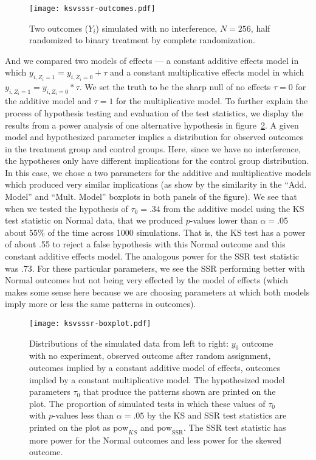 \begin{figure}[H]\centering
  \texttt{[image: ksvsssr-outcomes.pdf]}
  \caption{Two outcomes ($Y_i$) simulated with no interference, $N=256$, half
    randomized to binary treatment by complete randomization. }\label{fig:simpleoutcomes}
\end{figure}

And we compared two models of effects --- a constant additive effects model in
which $y_{i,Z_i=1}=y_{i,Z_i=0}+\tau$ and a constant multiplicative effects
model in which $y_{i,Z_i=1}=y_{i,Z_i=0}*\tau$. We set the truth to be the
sharp null of no effects $\tau=0$ for the additive model and $\tau=1$ for the
multiplicative model. To further explain the process of hypothesis testing and
evaluation of the test statistics, we display the results from a power
analysis of one alternative hypothesis in figure~\ref{fig:boxplot}. A given
model and hypothesized parameter implies a distribution for observed outcomes
in the treatment group and control groups. Here, since we have no
interference, the hypotheses only have different implications for the control
group distribution. In this case, we chose a two parameters for the additive
and multiplicative models which produced very similar implications (as show by
the similarity in the ``Add. Model'' and ``Mult.  Model'' boxplots in both
panels of the figure). We see that when we tested the hypothesis of
$\tau_0=.34$ from the additive model using the KS test statistic on Normal
data, that we produced $p$-values lower than $\alpha=.05$ about 55\% of the
time across 1000 simulations. That is, the KS test has a power of about .55
to reject a false hypothesis with this Normal outcome and this constant
additive effects model. The analogous power for the SSR test statistic was
.73. For these particular parameters, we see the SSR performing better with
Normal outcomes but not being very effected by the model of effects (which
makes some sense here because we are choosing parameters at which both models
imply more or less the same patterns in outcomes).

\begin{figure}[H]\centering
  \texttt{[image: ksvsssr-boxplot.pdf]}
  \caption{Distributions of the simulated data from left to right: $y_0$
    outcome with no experiment, observed outcome after random assignment,
    outcomes implied by a constant additive model of effects, outcomes implied by a constant
    multiplicative model. The hypothesized model parameters $\tau_0$ that
    produce the patterns shown are printed on the plot. The proportion of
    simulated tests in which these values of $\tau_0$ with $p$-values less
    than $\alpha=.05$ by the KS and SSR test statistics are printed on the plot as $\text{pow}_{KS}$ and
  $\text{pow}_\text{SSR}$. The SSR test statistic has more power for the
  Normal outcomes and less power for the skewed outcome.}\label{fig:boxplot}
\end{figure}

